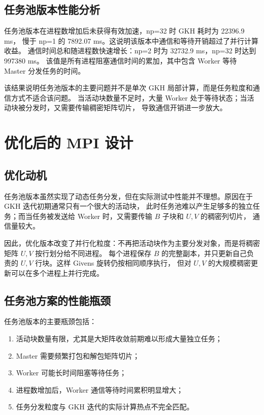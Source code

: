\documentclass[UTF8,a4paper,10pt]{ctexart}
\begin{document}
\subsection{任务池版本性能分析}
任务池版本在进程数增加后未获得有效加速，np=32 时 GKH 耗时为 22396.9 ms，
慢于 np=1 的 7892.07 ms。这说明该版本中通信和等待开销超过了并行计算收益。
通信时间总和随进程数快速增长：np=2 时为 32732.9 ms，np=32 时达到 997380 ms。
该值是所有进程阻塞通信时间的累加，其中包含 Worker 等待 Master 分发任务的时间。

该结果说明任务池版本的主要问题并不是单次 GKH 局部计算，而是任务粒度和通信方式不适合该问题。
当活动块数量不足时，大量 Worker 处于等待状态；当活动块被分发时，又需要传输稠密矩阵切片，
导致通信开销进一步放大。

\section{优化后的 MPI 设计}

\subsection{优化动机}
任务池版本虽然实现了动态任务分发，但在实际测试中性能并不理想。原因在于 GKH 迭代初期通常只有一个很大的活动块，
此时任务池难以产生足够多的独立任务；而当任务被发送给 Worker 时，又需要传输 $B$ 子块和 $U,V$ 的稠密列切片，
通信量较大。

因此，优化版本改变了并行化粒度：不再把活动块作为主要分发对象，而是将稠密矩阵 $U,V$ 按行划分给不同进程。
每个进程保存 $B$ 的完整副本，并只更新自己负责的 $U,V$ 行块。这样 Givens 旋转仍按相同顺序执行，
但对 $U,V$ 的大规模稠密更新可以在多个进程上并行完成。

\subsection{任务池方案的性能瓶颈}
任务池版本的主要瓶颈包括：
\begin{enumerate}
  \item 活动块数量有限，尤其是大矩阵收敛前期难以形成大量独立任务；
  \item Master 需要频繁打包和解包矩阵切片；
  \item Worker 可能长时间阻塞等待任务；
  \item 进程数增加后，Worker 通信等待时间累积明显增大；
  \item 任务分发粒度与 GKH 迭代的实际计算热点不完全匹配。
\end{enumerate}
\end{document}
